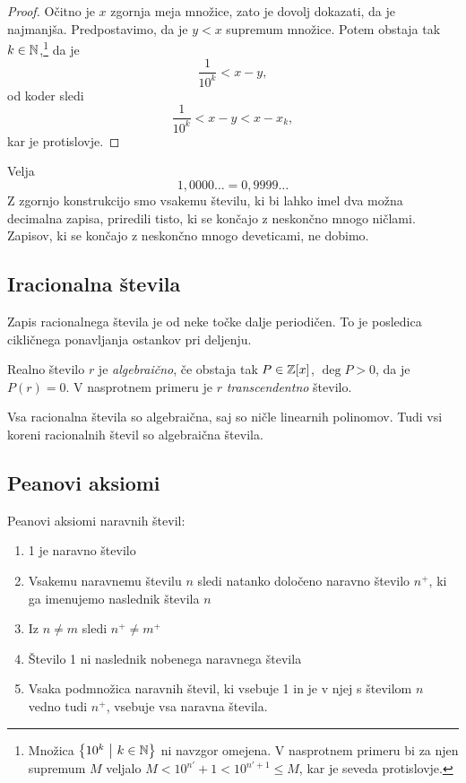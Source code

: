\documentclass[12pt, a4paper]{article}
\begin{document}
\begin{proof}
Očitno je $x$ zgornja meja množice, zato je dovolj dokazati, da je najmanjša. Predpostavimo, da je $y<x$ supremum množice. Potem obstaja tak $k\in\mathbb{N}$,\footnote{Množica $\left\{10^k~\middle\vert~k\in\mathbb{N}\right\}$ ni navzgor omejena. V nasprotnem primeru bi za njen supremum $M$ veljalo $M<10^{n'}+1<10^{n'+1}\leq M$, kar je seveda protislovje.} da je
\[
\frac{1}{10^k}<x-y,
\]
od koder sledi
\[
\frac{1}{10^k}<x-y<x-x_k,
\]
kar je protislovje.
\end{proof}

\begin{zgled}
Velja
\[
1,0000\ldots=0,9999\dots
\]
Z zgornjo konstrukcijo smo vsakemu številu, ki bi lahko imel dva možna decimalna zapisa, priredili tisto, ki se končajo z neskončno mnogo ničlami. Zapisov, ki se končajo z neskončno mnogo deveticami, ne dobimo.
\end{zgled}

\newpage

\subsection{Iracionalna števila}

Zapis racionalnega števila je od neke točke dalje periodičen. To je posledica cikličnega ponavljanja ostankov pri deljenju.

\begin{definicija}
Realno število $r$ je \emph{algebraično}, če obstaja tak $P\in\mathbb{Z}[x]$, $\deg P>0$, da je $P(r)=0$. V nasprotnem primeru je $r$ \emph{transcendentno} število.
\end{definicija}

\begin{posledica}
Vsa racionalna števila so algebraična, saj so ničle linearnih polinomov. Tudi vsi koreni racionalnih števil so algebraična števila.
\end{posledica}

\newpage

\subsection{Peanovi aksiomi}

\begin{okvir}
\begin{definicija}
Peanovi aksiomi naravnih števil:

\begin{enumerate}[label=P\arabic*.]
\item 1 je naravno število
\item Vsakemu naravnemu številu $n$ sledi natanko določeno naravno število $n^+$, ki ga imenujemo naslednik števila $n$
\item Iz $n\ne m$ sledi $n^+\ne m^+$
\item Število 1 ni naslednik nobenega naravnega števila
\item Vsaka podmnožica naravnih števil, ki vsebuje 1 in je v njej s številom $n$ vedno tudi $n^+$, vsebuje vsa naravna števila.
\end{enumerate}
\end{definicija}
\end{okvir}
\end{document}
